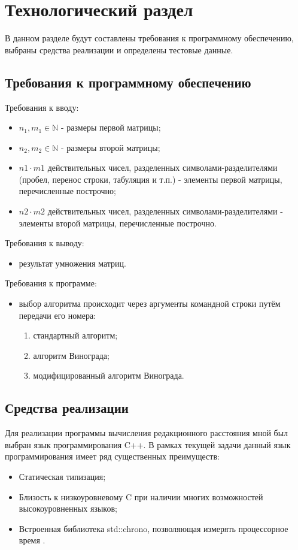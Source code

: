 \chapter{Технологический раздел}
\label{cha:impl}

В данном разделе будут составлены требования к программному обеспечению, выбраны средства реализации и определены тестовые данные.

\section{Требования к программному обеспечению}
Требования к вводу:
\begin{itemize}
    \item $n_1, m_1 \in \mathbb{N}$ - размеры первой матрицы;
    \item $n_2, m_2 \in \mathbb{N}$ - размеры второй матрицы;
    \item $n1 \cdot{} m1$ действительных чисел, разделенных символами-разделителями (пробел, перенос строки, табуляция и т.п.) - элементы первой матрицы, перечисленные построчно;
    \item $n2 \cdot{} m2$ действительных чисел, разделенных символами-разделителями - элементы второй матрицы, перечисленные построчно.
\end{itemize}
Требования к выводу:
\begin{itemize}
    \item результат умножения матриц.
\end{itemize}
Требования к программе:
\begin{itemize}
    \item выбор алгоритма происходит через аргументы командной строки путём передачи его номера:
        \begin{enumerate}[1)]
            \item стандартный алгоритм;
            \item алгоритм Винограда;
            \item модифицированный алгоритм Винограда.
        \end{enumerate}
\end{itemize}

\section{Средства реализации}
Для реализации программы вычисления редакционного расстояния мной был выбран язык программирования C++. В рамках текущей задачи данный язык программирования имеет ряд существенных преимуществ:
\begin{itemize}
    \item Статическая типизация;
    \item Близость к низкоуровневому C при наличии многих возможностей высокоуровненных языков;
    \item Встроенная библиотека std::chrono, позволяющая измерять процессорное время \cite{chronoart}.
\end{itemize}

